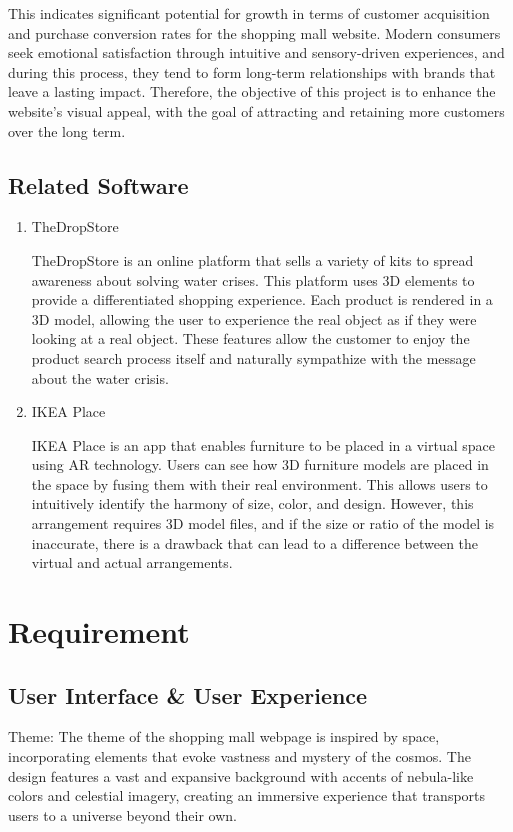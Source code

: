 \documentclass[conference]{IEEEtran}
\begin{document}
This indicates significant potential for growth in terms of customer acquisition and purchase conversion rates for the shopping mall website.
Modern consumers seek emotional satisfaction through intuitive and sensory-driven experiences, and during this process, they tend to form long-term relationships with brands that leave a lasting impact. Therefore, the objective of this project is to enhance
the website's visual appeal, with the goal of attracting and retaining more customers over the long term.

\subsection{Related Software}

\begin{enumerate}
\setlength{\parindent}{2ex}
\setlength{\parskip}{0.5em}
\item TheDropStore

TheDropStore is an online platform that sells a variety of kits to spread awareness about solving water crises. This platform uses 3D elements to provide a differentiated shopping experience. Each product is rendered in a 3D model, allowing the user to experience the real object as if they were looking at a real object. These features allow the customer to enjoy the product search process itself and naturally sympathize with the message about the water crisis.

\item IKEA Place 

IKEA Place is an app that enables furniture to be placed in a virtual space using AR technology. Users can see how 3D furniture models are placed in the space by fusing them with their real environment. This allows users to intuitively identify the harmony of size, color, and design. However, this arrangement requires 3D model files, and if the size or ratio of the model is inaccurate, there is a drawback that can lead to a difference between the virtual and actual arrangements.
\end{enumerate}

\section{Requirement}

\subsection{User Interface \& User Experience}
Theme: The theme of the shopping mall webpage is inspired by space, incorporating elements that evoke vastness and mystery of the cosmos. The design features a vast and expansive background with accents of nebula-like colors and celestial imagery, creating an immersive experience that transports users to a universe beyond their own. 
\end{document}
